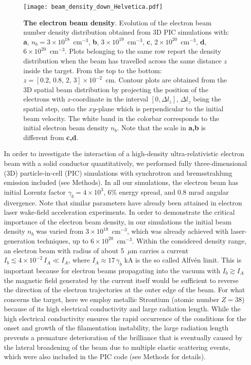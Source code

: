\documentclass[fleqn,11pt]{wlscirep}
\begin{document}
\begin{figure}[ht] %
\centering
\texttt{[image: beam\_density\_down\_Helvetica.pdf]}
\caption{{\bf The electron beam density}. Evolution of the electron beam number density distribution obtained from 3D PIC simulations with: 
\textbf{a}, $n_b=3\times10^{18}$~cm$^{-3}$, \textbf{b}, $3\times10^{19}$~cm$^{-3}$, \textbf{c}, $2\times10^{20}$~cm$^{-3}$, \textbf{d}, $6\times10^{20}$~cm$^{-3}$. Plots belonging to the same row report the density distribution when the beam has travelled across the same distance $z$ inside the target. From the top to the bottom: $z=[0.2,\,0.8,\,2,\,3]\times 10^{-2}$~cm. 
Contour plots are obtained from the 3D spatial beam distribution by projecting the position of the electrons with $z$-coordinate in the interval $[0,\Delta l_z]$, $\Delta l_z$ being the spatial step, onto the $xy$-plane which is perpendicular to the initial beam velocity.  
The white band in the colorbar corresponds to the initial electron beam density $n_b$. 
Note that the scale in \textbf{a,b} is different from \textbf{c,d}.
}
\label{fig:eb_dens}
\end{figure}


In order to investigate the interaction of a high-density ultra-relativistic electron beam with a solid conductor quantitatively, we performed fully three-dimensional (3D) particle-in-cell (PIC) simulations with synchrotron and bremsstrahlung emission included (see Methods). 
In all our simulations, the electron beam has initial Lorentz factor $\gamma_b=4\times10^3$, 6\% energy spread, and 0.8 mrad angular divergence. Note that similar parameters have already been attained in electron laser wake-field acceleration experiments\cite{PhysRevLett.117.124801,Wang2013,PhysRevLett.113.245002}. In order to demonstrate the critical importance of the electron beam density, in our simulations the initial beam density $n_b$ was varied from $3\times10^{18}$~cm$^{-3}$, which was already achieved with laser-generation techniques\cite{Malka2008}, up to $6\times10^{20}$~cm$^{-3}$. 
Within the considered density range, an electron beam with radius of about 5~$\mu$m carries a  current $I_b\lesssim4\times10^{-2}\,I_A \ll I_A$, where $I_A\approx17\,\gamma_b$ kA is the so called Alfv\'en limit\cite{MillerChargedBeams}. 
This is important because for electron beams propagating into the vacuum with $I_b\gtrsim I_A$ the magnetic field generated by the current itself would be sufficient to reverse the direction of the electron trajectories at the outer edge of the beam\cite{MillerChargedBeams}. 
For what concerns the target, here we employ metallic Strontium (atomic number $Z=38$) because of its high electrical conductivity and large radiation length. While the high electrical conductivity ensures the rapid occurrence of the conditions for the onset and growth of the filamentation instability, the large radiation length prevents a premature deterioration of the brilliance that is eventually caused by the lateral broadening of the beam due to multiple elastic scattering events, which were also included in the PIC code (see Methods for details). 
\end{document}
